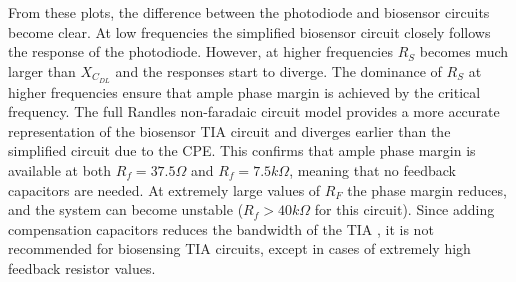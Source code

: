 From these plots, the difference between the photodiode and biosensor circuits become clear. At low frequencies the simplified biosensor circuit closely follows the response of the photodiode.  However, at higher frequencies $R_S$ becomes much larger than $X_{C_{DL}}$ and the responses start to diverge. The dominance of $R_S$ at higher frequencies ensure that ample phase margin is achieved by the critical frequency. The full Randles non-faradaic circuit model provides a more accurate representation of the biosensor TIA circuit and diverges earlier than the simplified circuit due to the \ac{CPE}. This confirms that ample phase margin is available at both $R_f=37.5\Omega$ and $R_f=7.5k\Omega$, meaning that no feedback capacitors are needed. At extremely large values of $R_F$ the phase margin reduces, and the system can become unstable ($R_f>40k\Omega$ for this circuit). Since adding compensation capacitors reduces the bandwidth of the TIA \cite{StabilizeYourTransimpedance}, it is not recommended for biosensing TIA circuits, except in cases of extremely high feedback resistor values.

